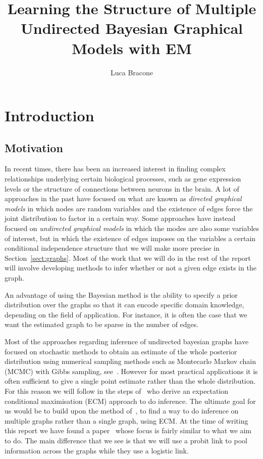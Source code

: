 \documentclass{scrartcl}
\author{Luca Bracone}
\title{Learning the Structure of Multiple Undirected Bayesian Graphical Models with EM}
\begin{document}
\maketitle

\section{Introduction}
\subsection{Motivation}
In recent times, there has been an increased interest in finding complex
relationships underlying certain biological processes, such as gene expression
levels or the structure of connections between neurons in the brain.
A lot of approaches in the past have focused on what are known as
\emph{directed graphical models} in which nodes are random variables and the
existence of edges force the joint distribution to factor in a certain way.
Some approaches have instead focused on \emph{undirected graphical models} in
which the modes are also some variables of interest, but in which the existence
of edges imposes on the variables a certain conditional independence structure
that we will make more precise in Section~\ref{sect:graphs}.
Most of the work that we will do in the rest of the report will involve developing methods to infer whether or not a given edge exists in  the graph.

An advantage of using the Bayesian method is the ability to specify a prior distribution over the graphs so that it can encode specific domain knowledge, depending on the field of application.
For instance, it is often the case that we want the estimated graph to be sparse in the number of edges.

Most of the approaches regarding inference of undirected bayesian graphs have focused on stochastic methods to obtain an estimate of the whole posterior distribution using numerical sampling methods such as Montecarlo Markov chain (MCMC) with Gibbs sampling, see~\cite{wang-2015}.
However for most practical applications it is often sufficient to give a single
point estimate rather than the whole distribution. For this reason we will
follow in the steps of~\cite{limcco-2017} who derive an expectation conditional
maximisation (ECM) approach to do inference.
The ultimate goal for us would be to build upon the method of~\cite{limcco-2017}, to find a way to do inference on multiple graphs rather than a single graph, using ECM.
At the time of writing this report we have found a paper~\cite{luke2017} whose
focus is fairly similar to what we aim to do. The main difference that we see
is that we will use a probit link to pool information across the graphs while
they use a logistic link.
\end{document}
